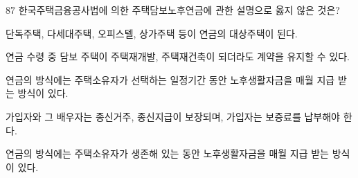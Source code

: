 \begin{question}{87}
한국주택금융공사법에 의한 주택담보노후연금에 관한 설명으로 옳지 않은 것은?
\begin{choices}
  \item 단독주택, 다세대주택, 오피스텔, 상가주택 등이 연금의 대상주택이 된다.
  \item 연금 수령 중 담보 주택이 주택재개발, 주택재건축이 되더라도 계약을 유지할 수 있다.
  \item 연금의 방식에는 주택소유자가 선택하는 일정기간 동안 노후생활자금을 매월 지급 받는 방식이 있다.
  \item 가입자와 그 배우자는 종신거주, 종신지급이 보장되며, 가입자는 보증료를 납부해야 한다.
  \item 연금의 방식에는 주택소유자가 생존해 있는 동안 노후생활자금을 매월 지급 받는 방식이 있다.
\end{choices}
\end{question}
